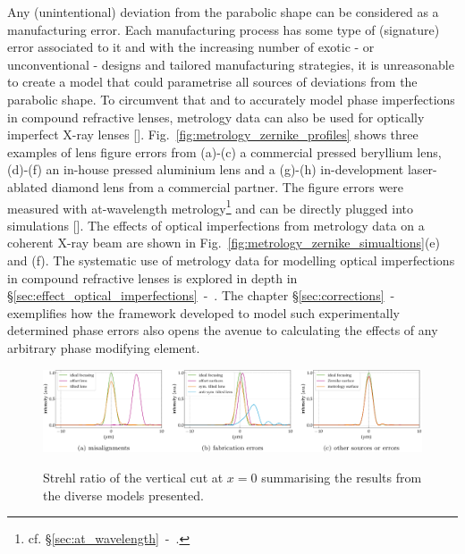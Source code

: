 \begin{refsection}
Any (unintentional) deviation from the parabolic shape can be considered as a manufacturing error. Each manufacturing process has some type of (signature) error associated to it and with the increasing number of exotic - or unconventional - designs and tailored manufacturing strategies, it is unreasonable to create a model that could parametrise all sources of deviations from the parabolic shape. To circumvent that and to accurately model phase imperfections in compound refractive lenses, metrology data can also be used for optically imperfect X-ray lenses [\cite{Celestre2020, Chubar2020}]. Fig.~\ref{fig:metrology_zernike_profiles} shows three examples of lens figure errors from (a)-(c) a commercial pressed beryllium lens, (d)-(f) an in-house pressed aluminium lens and a (g)-(h) in-development laser-ablated diamond lens from a commercial partner. The figure errors were measured with at-wavelength metrology\footnote{cf. \S\ref{sec:at_wavelength}~-~\textit{}.} and can be directly plugged into simulations [\cite{Celestre2020}]. The effects of optical imperfections from metrology data on a coherent X-ray beam are shown in Fig.~\ref{fig:metrology_zernike_simualtions}(e) and (f). The systematic use of metrology data for modelling optical imperfections in compound refractive lenses is explored in depth in \S\ref{sec:effect_optical_imperfections}~-~\textit{}. The chapter \S\ref{sec:corrections}~-~\textit{} exemplifies how the framework developed to model such experimentally determined phase errors also opens the avenue to calculating the effects of any arbitrary phase modifying element.

\begin{figure}[t]
        \centering
        {\includegraphics[width=1.\linewidth]{figures/ch04/Strehl}}
        \caption[Strehl ratio summarising the results from the diverse models presented]{Strehl ratio of the vertical cut at $x=0$ summarising the results from the diverse models presented.} \label{fig:Strehl_m}
\end{figure}

\end{refsection}

